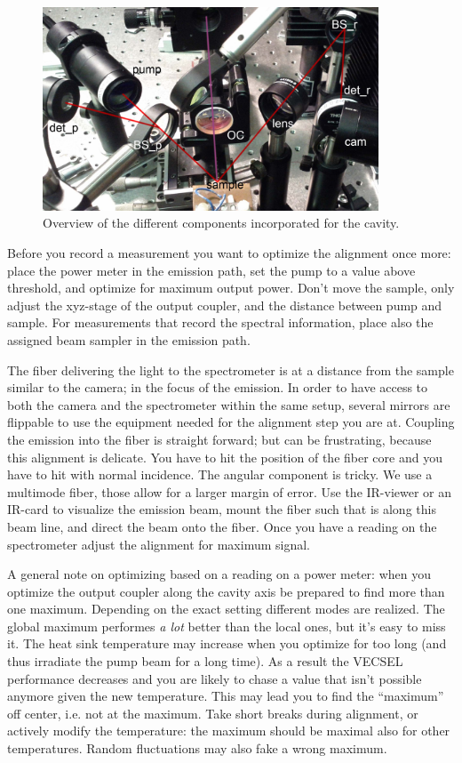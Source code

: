 \begin{figure}
\centering
\includegraphics[width=10cm]{img/cavity_all.jpg}
\caption{Overview of the different components incorporated for the cavity.}
\label{img:overview}
\end{figure}

Before you record a measurement
you want to optimize the alignment once more:
place the power meter
in the emission path,
set the pump to a value
above threshold,
and optimize
for maximum output power.
Don't move the sample,
only adjust
the xyz-stage
of the output coupler,
and the distance between
pump and sample.
For measurements
that record the spectral information,
place also the assigned beam sampler
in the emission path.

The fiber delivering the light
to the spectrometer
is at a distance
from the sample
similar to the camera;
in the focus of the emission.
In order to have access
to both the camera
and the spectrometer
within the same setup,
several mirrors
are flippable
to use the equipment needed for the alignment step
you are at.
Coupling the emission
into the fiber
is straight forward;
but can be frustrating,
because this alignment is delicate.
You have to hit the position of the fiber core
and you have to hit
with normal incidence.
The angular component
is tricky.
We use a multimode fiber,
those allow for a larger margin of error.
Use the IR-viewer or an IR-card
to visualize the emission beam,
mount the fiber
such that is along this beam line,
and direct the beam onto the fiber.
Once you have a reading
on the spectrometer
adjust the alignment
for maximum signal.

A general note on optimizing
based on a reading on a power meter:
when you optimize the output coupler
along the cavity axis
be prepared to find more than one maximum.
Depending on the exact setting
different modes are realized.
The global maximum
performes \emph{a lot} better
than the local ones,
but it's easy to miss it.
The heat sink temperature
may increase when you optimize for too long
(and thus irradiate the pump beam for a long time).
As a result the VECSEL performance
decreases and you are likely
to chase a value that isn't possible anymore
given the new temperature.
This may lead you to find the ``maximum'' off center,
i.e. not at the maximum.
Take short breaks during alignment,
or actively modify the temperature:
the maximum should be maximal also for other temperatures.
Random fluctuations may also fake a wrong maximum.

